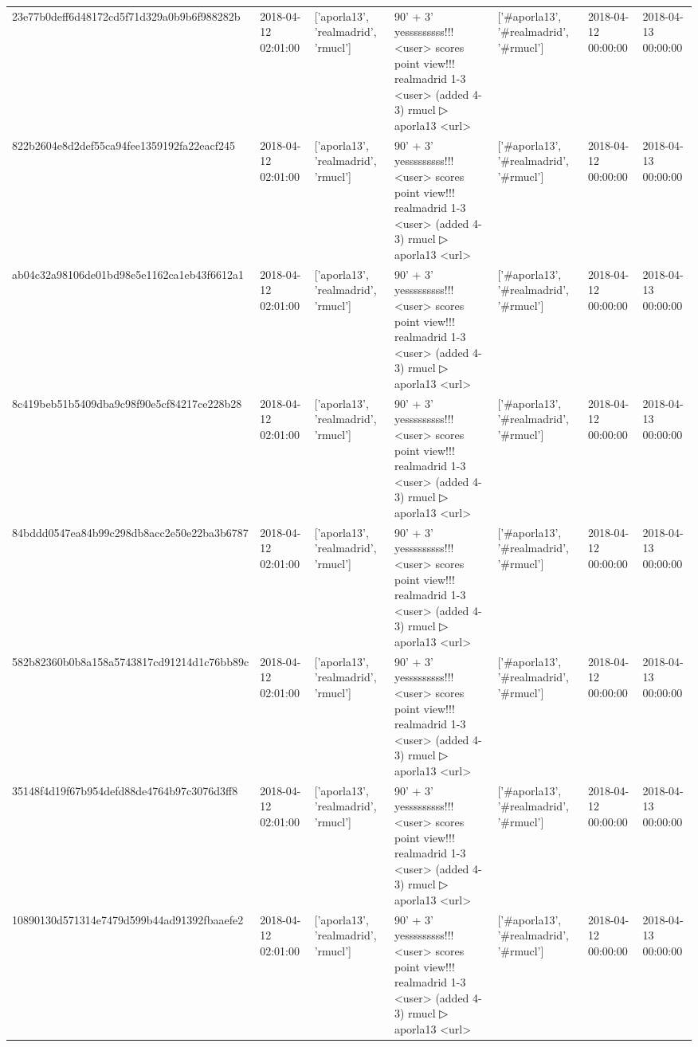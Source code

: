 \begin{tabular}{lllllll}
23e77b0deff6d48172cd5f71d329a0b9b6f988282b & 2018-04-12 02:01:00 & ['aporla13', 'realmadrid', 'rmucl'] & 90' + 3' yesssssssss!!! <user> scores point view!!! realmadrid 1-3 <user> (added 4-3) rmucl ▷ aporla13 <url> & ['#aporla13', '#realmadrid', '#rmucl'] & 2018-04-12 00:00:00 & 2018-04-13 00:00:00 \\
822b2604e8d2def55ca94fee1359192fa22eacf245 & 2018-04-12 02:01:00 & ['aporla13', 'realmadrid', 'rmucl'] & 90' + 3' yesssssssss!!! <user> scores point view!!! realmadrid 1-3 <user> (added 4-3) rmucl ▷ aporla13 <url> & ['#aporla13', '#realmadrid', '#rmucl'] & 2018-04-12 00:00:00 & 2018-04-13 00:00:00 \\
ab04c32a98106de01bd98e5e1162ca1eb43f6612a1 & 2018-04-12 02:01:00 & ['aporla13', 'realmadrid', 'rmucl'] & 90' + 3' yesssssssss!!! <user> scores point view!!! realmadrid 1-3 <user> (added 4-3) rmucl ▷ aporla13 <url> & ['#aporla13', '#realmadrid', '#rmucl'] & 2018-04-12 00:00:00 & 2018-04-13 00:00:00 \\
8c419beb51b5409dba9c98f90e5cf84217ce228b28 & 2018-04-12 02:01:00 & ['aporla13', 'realmadrid', 'rmucl'] & 90' + 3' yesssssssss!!! <user> scores point view!!! realmadrid 1-3 <user> (added 4-3) rmucl ▷ aporla13 <url> & ['#aporla13', '#realmadrid', '#rmucl'] & 2018-04-12 00:00:00 & 2018-04-13 00:00:00 \\
84bddd0547ea84b99c298db8acc2e50e22ba3b6787 & 2018-04-12 02:01:00 & ['aporla13', 'realmadrid', 'rmucl'] & 90' + 3' yesssssssss!!! <user> scores point view!!! realmadrid 1-3 <user> (added 4-3) rmucl ▷ aporla13 <url> & ['#aporla13', '#realmadrid', '#rmucl'] & 2018-04-12 00:00:00 & 2018-04-13 00:00:00 \\
582b82360b0b8a158a5743817cd91214d1c76bb89c & 2018-04-12 02:01:00 & ['aporla13', 'realmadrid', 'rmucl'] & 90' + 3' yesssssssss!!! <user> scores point view!!! realmadrid 1-3 <user> (added 4-3) rmucl ▷ aporla13 <url> & ['#aporla13', '#realmadrid', '#rmucl'] & 2018-04-12 00:00:00 & 2018-04-13 00:00:00 \\
35148f4d19f67b954defd88de4764b97c3076d3ff8 & 2018-04-12 02:01:00 & ['aporla13', 'realmadrid', 'rmucl'] & 90' + 3' yesssssssss!!! <user> scores point view!!! realmadrid 1-3 <user> (added 4-3) rmucl ▷ aporla13 <url> & ['#aporla13', '#realmadrid', '#rmucl'] & 2018-04-12 00:00:00 & 2018-04-13 00:00:00 \\
10890130d571314e7479d599b44ad91392fbaaefe2 & 2018-04-12 02:01:00 & ['aporla13', 'realmadrid', 'rmucl'] & 90' + 3' yesssssssss!!! <user> scores point view!!! realmadrid 1-3 <user> (added 4-3) rmucl ▷ aporla13 <url> & ['#aporla13', '#realmadrid', '#rmucl'] & 2018-04-12 00:00:00 & 2018-04-13 00:00:00 \\

\end{tabular}
